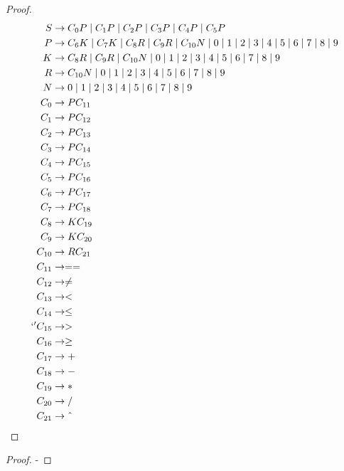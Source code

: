 \documentclass[12pt,a4paper]{article}%
\begin{document}

\begin{proof}

    \begin{align*}
      S  &\to C_0 P \mid C_1 P \mid C_2 P \mid C_3 P \mid C_4 P \mid C_5 P \\
      P  &\to C_6 K \mid C_7 K \mid C_8 R \mid C_9 R \mid C_{10} N \mid 0 \mid 1 \mid 2 \mid 3 \mid 4 \mid 5 \mid 6 \mid 7 \mid 8 \mid 9 \\
      K  &\to C_8 R \mid C_9 R \mid C_{10} N \mid 0 \mid 1 \mid 2 \mid 3 \mid 4 \mid 5 \mid 6 \mid 7 \mid 8 \mid 9 \\
      R  &\to C_{10} N \mid 0 \mid 1 \mid 2 \mid 3 \mid 4 \mid 5 \mid 6 \mid 7 \mid 8 \mid 9 \\
      N  &\to 0 \mid 1 \mid 2 \mid 3 \mid 4 \mid 5 \mid 6 \mid 7 \mid 8 \mid 9 \\
      C_0  &\to P C_{11} \\
      C_1  &\to P C_{12} \\
      C_2  &\to P C_{13} \\
      C_3  &\to P C_{14} \\
      C_4  &\to P C_{15} \\
      C_5  &\to P C_{16} \\
      C_6  &\to P C_{17} \\
      C_7  &\to P C_{18} \\
      C_8  &\to K C_{19} \\
      C_9  &\to K C_{20} \\
      C_{10}  &\to R C_{21} \\
      C_{11}  &\to == \\
      C_{12}  &\to \neq \\ 
      C_{13}  &\to < \\
      C_{14}  &\to \leq \\`'
      C_{15}  &\to > \\ 
      C_{16} &\to \geq \\
      C_{17}  &\to + \\
      C_{18}  &\to - \\
      C_{19}  &\to * \\
      C_{20}  &\to / \\
      C_{21}  &\to \string^
    \end{align*}

\end{proof}



\begin{proof}
  -
\end{proof}
\end{document}
